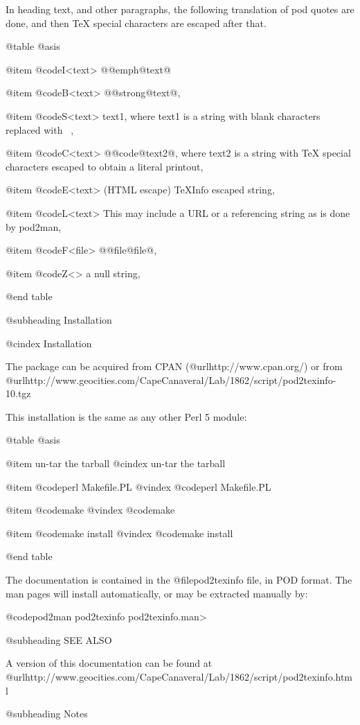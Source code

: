 In heading text, and other paragraphs, the following translation of pod
quotes are done, and then TeX special characters are escaped after that.

@table @asis

@item @code{I}<text>
@@emph@{text@}

@item @code{B}<text>
@@strong@{text@},

@item @code{S}<text>
text1,
where text1 is a string with blank characters replaced with ~,

@item @code{C}<text>
@@code@{text2@},
where text2 is a string with TeX special characters escaped to
obtain a literal printout,

@item @code{E}<text> (HTML escape)
TeXInfo escaped string,

@item @code{L}<text>
This may include a URL or a referencing string as is done by pod2man,

@item @code{F}<file>
@@file@{file@},

@item @code{Z}<>
a null string,

@end table

@subheading Installation

@cindex Installation

The package can be acquired from CPAN (@url{http://www.cpan.org/}) or from
@url{http://www.geocities.com/CapeCanaveral/Lab/1862/script/pod2texinfo-10.tgz}

This installation is the same as any other Perl 5 module:

@table @asis

@item un-tar the tarball
@cindex un-tar the tarball

@item @code{perl Makefile.PL}
@vindex @code{perl Makefile.PL}

@item @code{make}
@vindex @code{make}

@item @code{make install}
@vindex @code{make install}

@end table

The documentation is contained in the @file{pod2texinfo} file, in POD format.  The
man pages will install automatically, or may be extracted manually by:

@code{pod2man pod2texinfo } pod2texinfo.man>

@subheading SEE ALSO

A version of this documentation can be found at
@url{http://www.geocities.com/CapeCanaveral/Lab/1862/script/pod2texinfo.html}

@subheading Notes

